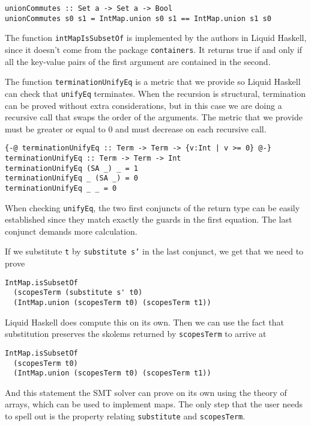 \documentclass[sigconf, anonymous, review]{acmart}
\newcommand{\tc}[1]{{\small\texttt{#1}}}
\begin{document}
\begin{verbatim}
unionCommutes :: Set a -> Set a -> Bool
unionCommutes s0 s1 = IntMap.union s0 s1 == IntMap.union s1 s0
\end{verbatim}

The function \tc{intMapIsSubsetOf} is implemented by the authors in Liquid
Haskell, since it doesn't come from the package \tc{containers}. It returns
true if and only if all the key-value pairs of the first argument are contained
in the second.

The function \tc{terminationUnifyEq} is a metric that we provide so Liquid
Haskell can check that \tc{unifyEq} terminates. When the recursion is
structural, termination can be proved without extra considerations, but in
this case we are doing a recursive call that swaps the order of the arguments.
The metric that we provide must be greater or equal to 0 and must decrease on
each recursive call.

\begin{verbatim}
{-@ terminationUnifyEq :: Term -> Term -> {v:Int | v >= 0} @-}
terminationUnifyEq :: Term -> Term -> Int
terminationUnifyEq (SA _) _ = 1
terminationUnifyEq _ (SA _) = 0
terminationUnifyEq _ _ = 0
\end{verbatim}

When checking \tc{unifyEq}, the two first conjuncts of the return type can
be easily established since they match exactly the guards in the first equation.
The last conjunct demands more calculation.

If we substitute \tc{t} by \tc{substitute s'} in the last conjunct, we get that we
need to prove

\begin{verbatim}
IntMap.isSubsetOf
  (scopesTerm (substitute s' t0)
  (IntMap.union (scopesTerm t0) (scopesTerm t1))
\end{verbatim}

Liquid Haskell does compute this on its own. Then we can use the fact that substitution
preserves the skolems returned by \tc{scopesTerm} to arrive at

\begin{verbatim}
IntMap.isSubsetOf
  (scopesTerm t0)
  (IntMap.union (scopesTerm t0) (scopesTerm t1))
\end{verbatim}

And this statement the SMT solver can prove on its own using the theory of arrays,
which can be used to implement maps. The only step that the user needs to spell out
is the property relating \tc{substitute} and \tc{scopesTerm}.
\end{document}
